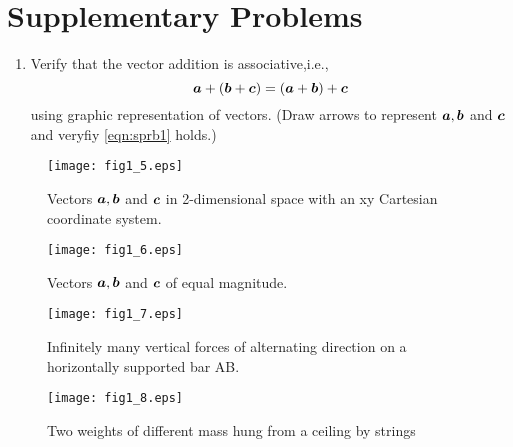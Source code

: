 \documentclass[10pt,a4j]{article}
\begin{document}
\section{Supplementary Problems}
\begin{enumerate}
\item
Verify that the vector addition is associative,i.e., 
\begin{equation}
	\mbox{\boldmath $a$}+(\mbox{\boldmath $b$}+\mbox{\boldmath $c$})= (\mbox{\boldmath $a$}+\mbox{\boldmath $b$})+\mbox{\boldmath $c$}
	\label{eqn:sprb1}
\end{equation}
using graphic representation of vectors. 
(Draw arrows to represent $\mbox{\boldmath $a$},\mbox{\boldmath $b$}$ and $\mbox{\boldmath $c$}$ and veryfiy \ref{eqn:sprb1} holds.)
\end{enumerate}
\begin{figure}[h]
	\begin{center}
	\texttt{[image: fig1\_5.eps]} 
	\end{center}
	\caption{Vectors $\mbox{\boldmath $a$}, \mbox{\boldmath $b$}$ and $\mbox{\boldmath $c$}$ in 2-dimensional space with an
	xy Cartesian coordinate system.}
	\label{fig:fig1_5}
\end{figure}
\begin{figure}[h]
	\begin{center}
	\texttt{[image: fig1\_6.eps]} 
	\end{center}
	\caption{Vectors $\mbox{\boldmath $a$}, \mbox{\boldmath $b$}$ and $\mbox{\boldmath $c$}$ of equal magnitude.} 
	\label{fig:fig1_6}
\end{figure}
\begin{figure}[h]
	\begin{center}
	\texttt{[image: fig1\_7.eps]} 
	\end{center}
	\caption{Infinitely many vertical forces of alternating direction on 
	a horizontally supported bar AB.}
	\label{fig:fig1_7}
\end{figure}
\begin{figure}[h]
	\begin{center}
	\texttt{[image: fig1\_8.eps]} 
	\end{center}
	\caption{Two weights of different mass hung from a ceiling by strings} 
	\label{fig:fig1_8}
\end{figure}
%
\end{document}
